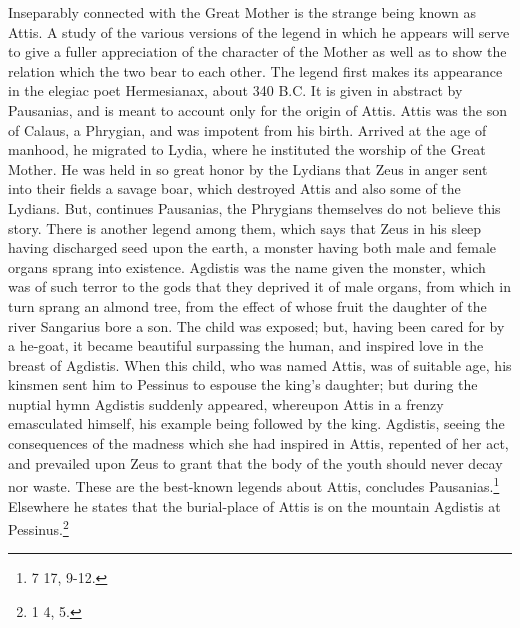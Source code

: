 \documentclass[a4paper, 11pt, oneside, polutonikogreek, english]{article}
\begin{document}
Inseparably connected with the Great Mother is the strange being known as Attis. A study of the various versions of the legend in which he appears will serve to give a fuller appreciation of the character of the Mother as well as to show the relation which the two bear to each other. The legend first makes its appearance in the elegiac poet Hermesianax, about 340 \textsc{B.C.} It is given in abstract by Pausanias, and is meant to account only for the origin of Attis. Attis was the son of Calaus, a Phrygian, and was impotent from his birth. Arrived at the age of manhood, he migrated to Lydia, where he instituted the worship of the Great Mother. He was held in so great honor by the Lydians that Zeus in anger sent into their fields a savage boar, which destroyed Attis and also some of the Lydians. But, continues Pausanias, the Phrygians themselves do not believe this story. There is another legend among them, which says that Zeus in his sleep having discharged seed upon the earth, a monster having both male and female organs sprang into existence. Agdistis was the name given the monster, which was of such terror to the gods that they deprived it of male organs, from which in turn sprang an almond tree, from the effect of whose fruit the daughter of the river Sangarius bore a son. The child was exposed; but, having been cared for by a he-goat, it became beautiful surpassing the human, and inspired love in the breast of Agdistis. When this child, who was named Attis, was of suitable age, his kinsmen sent him to Pessinus to espouse the king's daughter; but during the nuptial hymn Agdistis suddenly appeared, whereupon Attis in a frenzy emasculated himself, his example being followed by the king. Agdistis, seeing the consequences of the madness which she had inspired in Attis, repented of her act, and prevailed upon Zeus to grant that the body of the youth should never decay nor waste. These are the best-known legends about Attis, concludes Pausanias.\footnote{7 17, 9-12.} Elsewhere he states that the burial-place of Attis is on the mountain Agdistis at Pessinus.\footnote{1 4, 5.}
\end{document}
